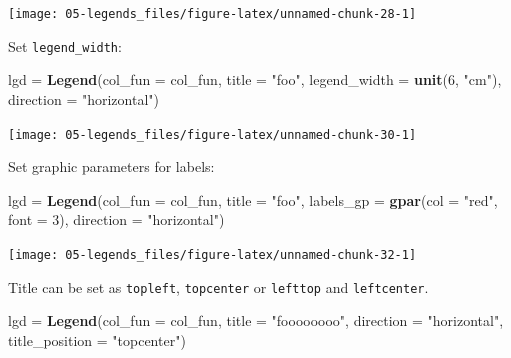 \documentclass[]{book}
\newenvironment{Shaded}{\begin{snugshade}}{\end{snugshade}}
\newcommand{\KeywordTok}[1]{\textcolor[rgb]{0.13,0.29,0.53}{\textbf{#1}}}
\newcommand{\DataTypeTok}[1]{\textcolor[rgb]{0.13,0.29,0.53}{#1}}
\newcommand{\DecValTok}[1]{\textcolor[rgb]{0.00,0.00,0.81}{#1}}
\newcommand{\StringTok}[1]{\textcolor[rgb]{0.31,0.60,0.02}{#1}}
\newcommand{\NormalTok}[1]{#1}
\theoremstyle{definition}
\theoremstyle{definition}
\theoremstyle{definition}
\theoremstyle{remark}
\begin{document}
\begin{center}\texttt{[image: 05-legends\_files/figure-latex/unnamed-chunk-28-1]} \end{center}

Set \texttt{legend\_width}:

\begin{Shaded}
\begin{Highlighting}[]
\NormalTok{lgd =}\StringTok{ }\KeywordTok{Legend}\NormalTok{(}\DataTypeTok{col_fun =}\NormalTok{ col_fun, }\DataTypeTok{title =} \StringTok{"foo"}\NormalTok{, }\DataTypeTok{legend_width =} \KeywordTok{unit}\NormalTok{(}\DecValTok{6}\NormalTok{, }\StringTok{"cm"}\NormalTok{), }
    \DataTypeTok{direction =} \StringTok{"horizontal"}\NormalTok{)}
\end{Highlighting}
\end{Shaded}

\begin{center}\texttt{[image: 05-legends\_files/figure-latex/unnamed-chunk-30-1]} \end{center}

Set graphic parameters for labels:

\begin{Shaded}
\begin{Highlighting}[]
\NormalTok{lgd =}\StringTok{ }\KeywordTok{Legend}\NormalTok{(}\DataTypeTok{col_fun =}\NormalTok{ col_fun, }\DataTypeTok{title =} \StringTok{"foo"}\NormalTok{, }\DataTypeTok{labels_gp =} \KeywordTok{gpar}\NormalTok{(}\DataTypeTok{col =} \StringTok{"red"}\NormalTok{, }\DataTypeTok{font =} \DecValTok{3}\NormalTok{), }
    \DataTypeTok{direction =} \StringTok{"horizontal"}\NormalTok{)}
\end{Highlighting}
\end{Shaded}

\begin{center}\texttt{[image: 05-legends\_files/figure-latex/unnamed-chunk-32-1]} \end{center}

Title can be set as \texttt{topleft}, \texttt{topcenter} or
\texttt{lefttop} and \texttt{leftcenter}.

\begin{Shaded}
\begin{Highlighting}[]
\NormalTok{lgd =}\StringTok{ }\KeywordTok{Legend}\NormalTok{(}\DataTypeTok{col_fun =}\NormalTok{ col_fun, }\DataTypeTok{title =} \StringTok{"foooooooo"}\NormalTok{, }\DataTypeTok{direction =} \StringTok{"horizontal"}\NormalTok{, }
    \DataTypeTok{title_position =} \StringTok{"topcenter"}\NormalTok{)}
\end{Highlighting}
\end{Shaded}
\end{document}
